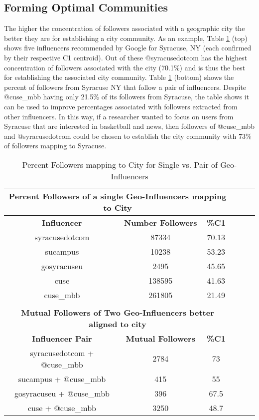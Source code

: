 \subsection{Forming Optimal Communities}

The higher the concentration of followers associated with a geographic city the better they are for establishing a city community. As an example, Table \ref{table_4_7} (top) shows five influencers recommended by Google for Syracuse, NY (each confirmed by their respective C1 centroid). Out of these @syracusedotcom has the highest concentration of followers associated with the city (70.1\%) and is thus the best for establishing the associated city community. Table \ref{table_4_7} (bottom) shows the percent of followers from Syracuse NY that follow a pair of influencers. Despite @cuse{\_}mbb having only 21.5\% of its followers from Syracuse, the table shows it can be used to improve percentages associated with followers extracted from other influencers. In this way, if a researcher wanted to focus on users from Syracuse that are interested in basketball and news, then followers of @cuse{\_}mbb and @syracusedotcom could be chosen to establish the city community with 73\% of followers mapping to Syracuse. 

\begin{table}
\small
\caption{Percent Followers mapping to City for Single vs. Pair of Geo-Influencers}
\label{table_4_7}
\begin{center}
\begin{tabular}{|c|c|c|c|c|c|}
\multicolumn{3}{c}{\bfseries Percent Followers of a single Geo-Influencers mapping to City}\\
\hline
\bfseries Influencer & \bfseries Number Followers & \bfseries \%C1\\
\hline
syracusedotcom&87334&70.13\\
\hline
sucampus&10238&53.23\\
\hline
gosyracuseu&2495&45.65\\
\hline
cuse&138595&41.63\\
\hline
cuse{\_}mbb&261805&21.49\\
\hline
\multicolumn{3}{c}{}\\
\multicolumn{3}{c}{\bfseries Mutual Followers of Two Geo-Influencers better aligned to city}\\
\hline
\bfseries Influencer Pair & \bfseries Mutual Followers & \bfseries \%C1\\
\hline
syracusedotcom + @cuse{\_}mbb&2784&73\\
\hline
sucampus + @cuse{\_}mbb&415&55\\
\hline
gosyracuseu + @cuse{\_}mbb&396&67.5\\
\hline
cuse + @cuse{\_}mbb&3250&48.7\\
\hline
\end{tabular}
\end{center}
\end{table}

